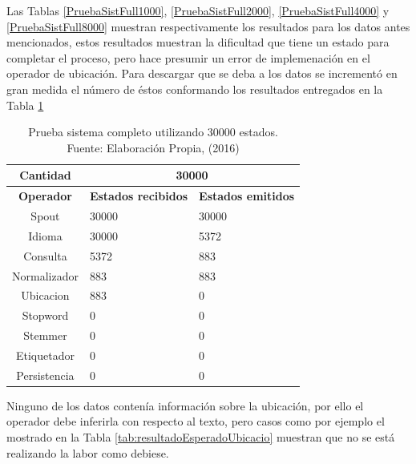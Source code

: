 Las Tablas \ref{PruebaSistFull1000}, \ref{PruebaSistFull2000}, \ref{PruebaSistFull4000} y \ref{PruebaSistFull8000} muestran respectivamente los resultados para los datos antes mencionados, estos resultados muestran la dificultad que tiene un estado para completar el proceso, pero hace presumir un error de implemenación en el operador de ubicación. Para descargar que se deba a los datos se incrementó en gran medida el número de éstos conformando los resultados entregados en la Tabla \ref{tab:PruebaSistFull30000}

\begin{table}[H]
\centering
\caption[Prueba sistema completo utilizando 30000 estados.]{Prueba sistema completo utilizando 30000 estados.\\Fuente: Elaboración Propia, (2016)}
\label{tab:PruebaSistFull30000}
\begin{tabular}{|c|l|l|}
\hline
\textbf{Cantidad} & \multicolumn{2}{c|}{\textbf{30000}} \\ \hline
\textbf{Operador} & \multicolumn{1}{c|}{\textbf{Estados recibidos}} & \multicolumn{1}{c|}{\textbf{Estados emitidos}} \\ \hline
Spout & 30000 & 30000 \\ \hline
Idioma & 30000 & 5372 \\ \hline
Consulta & 5372 & 883 \\ \hline
Normalizador & 883 & 883 \\ \hline
Ubicacion & 883 & 0 \\ \hline
Stopword & 0 & 0 \\ \hline
Stemmer & 0 & 0 \\ \hline
Etiquetador & 0 & 0 \\ \hline
Persistencia & 0 & 0 \\ \hline
\end{tabular}
\end{table}

 Ninguno de los datos contenía información sobre la ubicación, por ello el operador debe inferirla con respecto al texto, pero casos como por ejemplo el mostrado en la Tabla \ref{tab:resultadoEsperadoUbicacio} muestran que no se está realizando la labor como debiese.


